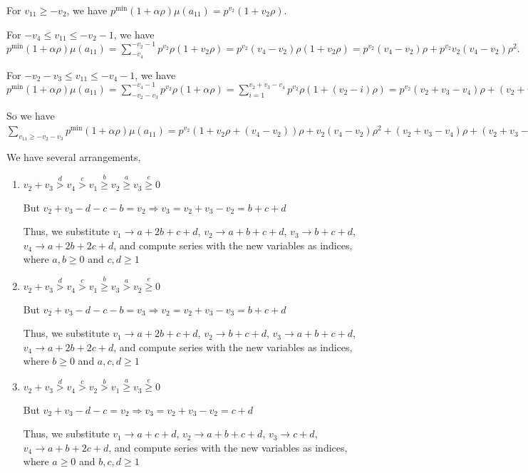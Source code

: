 \documentclass{article}
\begin{document}
For $v_{11}\geq{-v_2}$, we have $p^{\min}(1+\alpha\rho)\mu(a_{11})=p^{v_2}(1+v_2\rho).$

For $-v_4\leq{v_{11}}\leq{-v_2-1}$, we have $p^{\min}(1+\alpha\rho)\mu(a_{11})=\sum_{-v_4}^{-v_2-1}p^{v_2}\rho(1+v_2\rho)=p^{v_2}(v_4-v_2)\rho(1+v_2\rho)=p^{v_2}(v_4-v_2)\rho+p^{v_2}v_2(v_4-v_2)\rho^2.$

For $-v_2-v_3\leq{v_{11}}\leq{-v_4-1}$, we have $p^{\min}(1+\alpha\rho)\mu(a_{11})=\sum_{-v_2-v_3}^{-v_4-1}p^{v_2}\rho(1+\alpha\rho)=\sum_{i=1}^{v_2+v_3-v_4}p^{v_2}\rho(1+(v_2-i)\rho)=p^{v_2}(v_2+v_3-v_4)\rho+(v_2+v_3-v_4)v_2\rho^2-\binom{v_2+v_3-v_4+1}{2}\rho^2.$

So we have $\sum_{v_{11}\geq{-v_2-v_3}}p^{\min}(1+\alpha\rho)\mu(a_{11})=p^{v_2}(1+v_2\rho+(v_4-v_2))\rho+v_2(v_4-v_2)\rho^2+(v_2+v_3-v_4)\rho+(v_2+v_3-v_4)v_2\rho^2-\frac{(v_2+v_3-v_4+1)(v_2+v_3-v_4)}{2}\rho^2).$

We have several arrangements,
\begin{enumerate}
\item 
$v_2+v_3\overset{d}{>}v_4\overset{c}{>}v_1\overset{b}{\geq}{v_2}\overset{a}{\geq}v_3\overset{e}{\geq}{0}$

But $v_2+v_3-d-c-b=v_2\Rightarrow{v_3=v_2+v_3-v_2=b+c+d}$

Thus, we substitute 
$v_1\rightarrow{a+2b+c+d}$, 
$v_2\rightarrow{a+b+c+d}$, 
$v_3\rightarrow{b+c+d}$, 
$v_4\rightarrow{a+2b+2c+d}$, and compute series with the new variables as indices, where $a,b\geq{0}$ and $c,d\geq{1}$

\item 
$v_2+v_3\overset{d}{>}v_4\overset{c}{>}v_1\overset{b}{\geq}{v_3}\overset{a}{>}v_2\overset{e}{\geq}{0}$

But $v_2+v_3-d-c-b=v_3\Rightarrow{v_2=v_2+v_3-v_3=b+c+d}$

Thus, we substitute 
$v_1\rightarrow{a+2b+c+d}$, 
$v_2\rightarrow{b+c+d}$, 
$v_3\rightarrow{a+b+c+d}$, 
$v_4\rightarrow{a+2b+2c+d}$, and compute series with the new variables as indices, where $b\geq{0}$ and $a,c,d\geq{1}$
\item 
$v_2+v_3\overset{d}{>}v_4\overset{c}{>}v_2\overset{b}{>}{v_1}\overset{a}{\geq}v_3\overset{e}{\geq}{0}$

But $v_2+v_3-d-c=v_2\Rightarrow{v_3=v_2+v_3-v_2=c+d}$

Thus, we substitute 
$v_1\rightarrow{a+c+d}$, 
$v_2\rightarrow{a+b+c+d}$, 
$v_3\rightarrow{c+d}$, 
$v_4\rightarrow{a+b+2c+d}$, and compute series with the new variables as indices, where $a\geq{0}$ and $b,c,d\geq{1}$

\end{enumerate}
\end{document}
